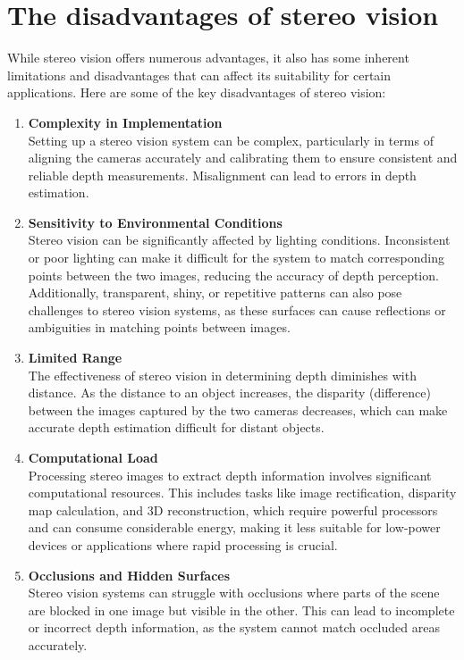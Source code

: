 \documentclass[22pt]{report}
\begin{document}
    \section{The disadvantages of stereo vision}
        While stereo vision offers numerous advantages, it also has some inherent limitations and disadvantages that can affect its suitability for certain applications. Here are some of the key disadvantages of stereo vision:
        \begin{enumerate}
            \item \textbf{Complexity in Implementation}\\
                Setting up a stereo vision system can be complex, particularly in terms of aligning the cameras accurately and calibrating them to ensure consistent and reliable depth measurements. Misalignment can lead to errors in depth estimation.
            \item \textbf{Sensitivity to Environmental Conditions} \\
                Stereo vision can be significantly affected by lighting conditions. Inconsistent or poor lighting can make it difficult for the system to match corresponding points between the two images, reducing the accuracy of depth perception.
                Additionally, transparent, shiny, or repetitive patterns can also pose challenges to stereo vision systems, as these surfaces can cause reflections or ambiguities in matching points between images.
            \item \textbf{Limited Range}\\
                The effectiveness of stereo vision in determining depth diminishes with distance. As the distance to an object increases, the disparity (difference) between the images captured by the two cameras decreases, which can make accurate depth estimation difficult for distant objects.
            \item \textbf{Computational Load}\\
                Processing stereo images to extract depth information involves significant computational resources. This includes tasks like image rectification, disparity map calculation, and 3D reconstruction, which require powerful processors and can consume considerable energy, making it less suitable for low-power devices or applications where rapid processing is crucial.
            \item \textbf{Occlusions and Hidden Surfaces} \\
                Stereo vision systems can struggle with occlusions where parts of the scene are blocked in one image but visible in the other. This can lead to incomplete or incorrect depth information, as the system cannot match occluded areas accurately.

\end{enumerate}
\end{document}
